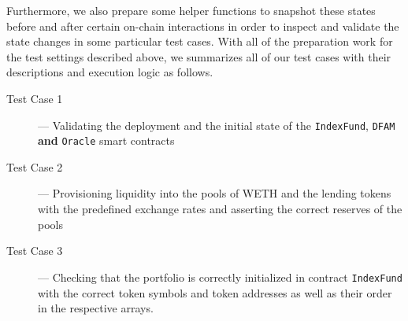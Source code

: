 Furthermore, we also prepare some helper functions to snapshot these states before and after certain on-chain interactions in order to inspect and validate the state changes in some particular test cases. With all of the preparation work for the test settings described above, we summarizes all of our test cases with their descriptions and execution logic as follows. 


\begin{description}
    \item[Test Case 1] --- Validating the deployment and the initial state of the \texttt{IndexFund}, \texttt{DFAM} \textbf{and} \texttt{Oracle} smart contracts


    \item[Test Case 2] --- Provisioning liquidity into the pools of WETH and the lending tokens with the predefined exchange rates and asserting the correct reserves of the pools

        
    \item[Test Case 3] --- Checking that the portfolio is correctly initialized in contract \texttt{IndexFund} with the correct token symbols and token addresses as well as their order in the respective arrays.

\end{description}

